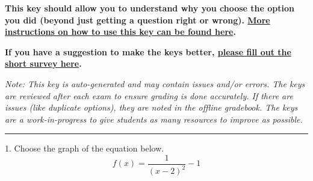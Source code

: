 \documentclass{extbook}[14pt]
\begin{document}
\textbf{This key should allow you to understand why you choose the option you did (beyond just getting a question right or wrong). \href{https://xronos.clas.ufl.edu/mac1105spring2020/courseDescriptionAndMisc/Exams/LearningFromResults}{More instructions on how to use this key can be found here}.}

\textbf{If you have a suggestion to make the keys better, \href{https://forms.gle/CZkbZmPbC9XALEE88}{please fill out the short survey here}.}

\textit{Note: This key is auto-generated and may contain issues and/or errors. The keys are reviewed after each exam to ensure grading is done accurately. If there are issues (like duplicate options), they are noted in the offline gradebook. The keys are a work-in-progress to give students as many resources to improve as possible.}

\rule{\textwidth}{0.4pt}

1. Choose the graph of the equation below.
\[ f(x) = \frac{1}{(x - 2)^2} - 1 \] 
\end{document}
